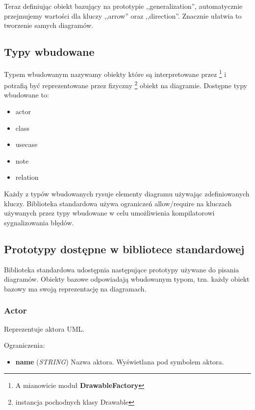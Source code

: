 Teraz definiując obiekt bazujący na prototypie ,,generalization'', automatycznie przejmujemy wartości dla kluczy ,,arrow'' oraz ,,direction''. Znacznie ułatwia to tworzenie samych diagramów.

\subsection{Typy wbudowane}

Typem wbudowanym nazywamy obiekty które są interpretowane przez \omlet \footnote{A mianowicie moduł \textbf{DrawableFactory}} i potrafią być reprezentowane przez fizyczny \footnote{instancja pochodnych klasy Drawable} obiekt na diagramie. Dostępne typy wbudowane to:

\begin{itemize}
	\item actor
	\item class
	\item usecase
	\item note
	\item relation
\end{itemize}

Każdy z typów wbudowanych rysuje elementy diagramu używając zdefiniowanych kluczy. Biblioteka standardowa używa ograniczeń allow/require na kluczach używanych przez typy wbudowane w celu umożliwienia kompilatorowi sygnalizowania błędów.

\subsection{Prototypy dostępne w bibliotece standardowej}

Biblioteka standardowa udostępnia następujące prototypy używane do pisania diagramów. Obiekty bazowe odpowiadają wbudowanym typom, tzn. każdy obiekt bazowy ma swoją reprezentację na diagramach.

\subsubsection{Actor}
Reprezentuje aktora UML.

Ograniczenia:
\begin{itemize}
	\item \textbf{name} (\emph{STRING}) Nazwa aktora. Wyświetlana pod symbolem aktora.
\end{itemize}
	
